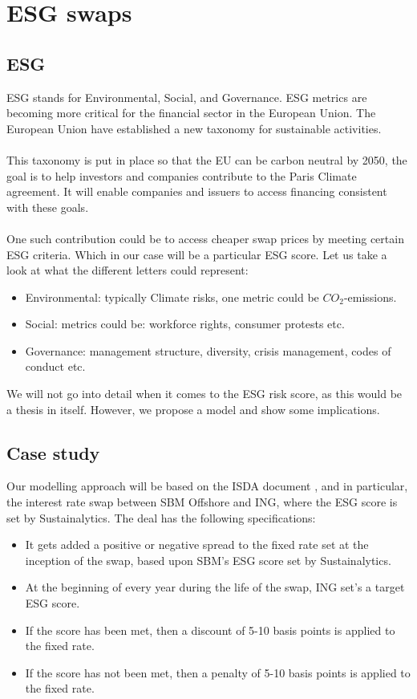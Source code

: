 \chapter{ESG swaps}


\section{ESG}
ESG  stands for Environmental, Social, and Governance. ESG metrics are becoming more critical for the financial sector in the European Union. The European Union have established a new taxonomy \cite{EU:2021} for sustainable activities. 
\\~\\
This taxonomy is put in place so that the EU can be carbon neutral by 2050, the goal is to help investors and companies contribute to the Paris Climate agreement. It will enable companies and issuers to access financing consistent with these goals.
\\~\\ 
One such contribution could be to access cheaper swap prices by meeting certain ESG criteria. Which in our case will be a particular ESG score. Let us take a look at what the different letters could represent:
\begin{itemize}
    \item Environmental: typically Climate risks, one metric could be $CO_{2}$-emissions. 
    \item Social: metrics could be: workforce rights, consumer protests etc. 
    \item Governance: management structure, diversity, crisis management, codes of conduct etc. 
\end{itemize}

We will not go into detail when it comes to the ESG risk score, as this would be a thesis in itself. However, we propose a model and show some implications. 

\newpage 

\section{Case study}
Our modelling approach will be based on the ISDA document \cite{ISDA:2021}, and in particular, the interest rate swap between SBM Offshore and ING, where the ESG score is set by Sustainalytics. The deal has the following specifications:
\begin{itemize}
    \item It gets added a positive or negative spread to the fixed rate set at the inception of the swap, based upon SBM's ESG score set by Sustainalytics. 
    \item At the beginning of every year during the life of the swap, ING set's a target ESG score.
    \item If the score has been met, then a discount of 5-10 basis points is applied to the fixed rate.
    \item If the score has not been met, then a penalty of 5-10 basis points is applied to the fixed rate. 
\end{itemize} 

